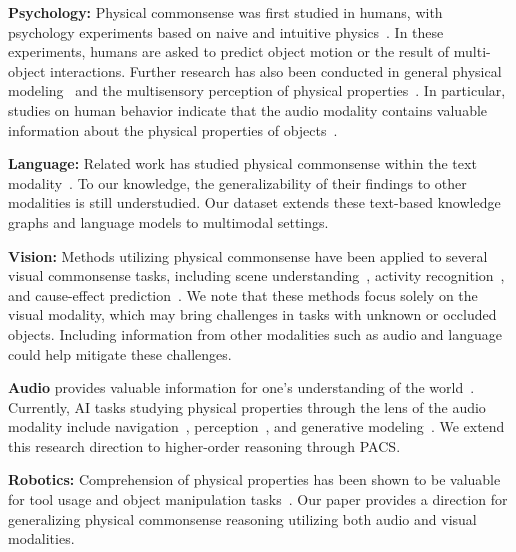 \documentclass[runningheads]{llncs}
\newcommand{\names}{\textsc{PACS}}
\begin{document}
\noindent
\textbf{Psychology:} Physical commonsense was first studied in humans, with psychology experiments based on naive and intuitive physics~\cite{bobrow1984qualitative,forbus1984qualitative,hayes1987knowledge,hespos2016objects,mccloskey1983intuitive}. In these experiments, humans are asked to predict object motion or the result of multi-object interactions. Further research has also been conducted in general physical modeling~\cite{bliss2008commonsense} and the multisensory perception of physical properties~\cite{corlett2018conditioned,minsky2000commonsense,zhang2017shape}. In particular, studies on human behavior indicate that the audio modality contains valuable information about the physical properties of objects~\cite{handel1995timbre,minsky2000commonsense,morrongiello1998crossmodal,wilcox2006shake}.

\noindent
\textbf{Language:} Related work has studied physical commonsense within the text modality~\cite{bisk2020piqa,Forbes2019DoNL,jimenez2020learning,Storks2021TieredRF,zhao-etal-2020-learning}. To our knowledge, the generalizability of their findings to other modalities is still understudied. Our dataset extends these text-based knowledge graphs and language models to multimodal settings.

\noindent
\textbf{Vision:} Methods utilizing physical commonsense have been applied to several visual commonsense tasks, including scene understanding~\cite{Chen_2019_ICCV,wu2017deanimation}, activity recognition~\cite{li2022hake}, and cause-effect prediction~\cite{mottaghi2016whatif}. We note that these methods focus solely on the visual modality, which may bring challenges in tasks with unknown or occluded objects. Including information from other modalities such as audio and language could help mitigate these challenges.

\noindent
\textbf{Audio} provides valuable information for one's understanding of the world~\cite{handel1995timbre,wilcox2006shake}. Currently, AI tasks studying physical properties through the lens of the audio modality include navigation~\cite{chen2020soundspaces}, perception~\cite{zhang2017shape}, and generative modeling~\cite{Zhang_2017_ICCV,gao2021ObjectFolder}. We extend this research direction to higher-order reasoning through \names.

\noindent
\textbf{Robotics:} Comprehension of physical properties has been shown to be valuable for tool usage and object manipulation tasks~\cite{agrawal2016learning,coumans2021,nair2019tool,toussaint2018differentiable,tuli2021tango}. Our paper provides a direction for generalizing physical commonsense reasoning utilizing both audio and visual modalities.
\end{document}
